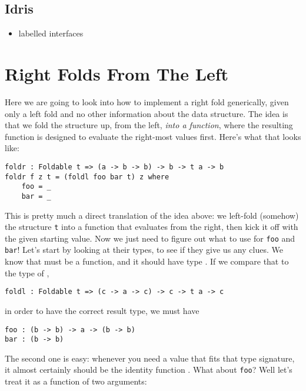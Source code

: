 \subsection{Idris}\label{lang:idris}

\begin{itemize}
    \item labelled interfaces
\end{itemize}

\section{Right Folds From The Left}\label{endo}

Here we are going to look into how to implement a right fold generically, given only a left fold and no other information about the data structure. The idea is that we fold the structure up, from the left, \emph{into a function}, where the resulting function is designed to evaluate the right-most values first. Here's what that looks like:

\begin{lstlisting}[language=pseudoml]
foldr : Foldable t => (a -> b -> b) -> b -> t a -> b
foldr f z t = (foldl foo bar t) z where
    foo = _
    bar = _
\end{lstlisting}

This is pretty much a direct translation of the idea above: we left-fold (somehow) the structure \texttt{t} into a function that evaluates from the right, then kick it off with the given starting value. Now we just need to figure out what to use for \texttt{foo} and \texttt{bar}! Let's start by looking at their types, to see if they give us any clues. We know that  must be a function, and it should have type . If we compare that to the type of ,

\begin{lstlisting}[language=pseudoml]
foldl : Foldable t => (c -> a -> c) -> c -> t a -> c
\end{lstlisting}

\noindent in order to have the correct result type, we must have

\begin{lstlisting}[language=pseudoml]
foo : (b -> b) -> a -> (b -> b)
bar : (b -> b)
\end{lstlisting}

The second one is easy: whenever you need a value that fits that type signature, it almost certainly should be the identity function . What about \texttt{foo}? Well let's treat it as a function of two arguments:

